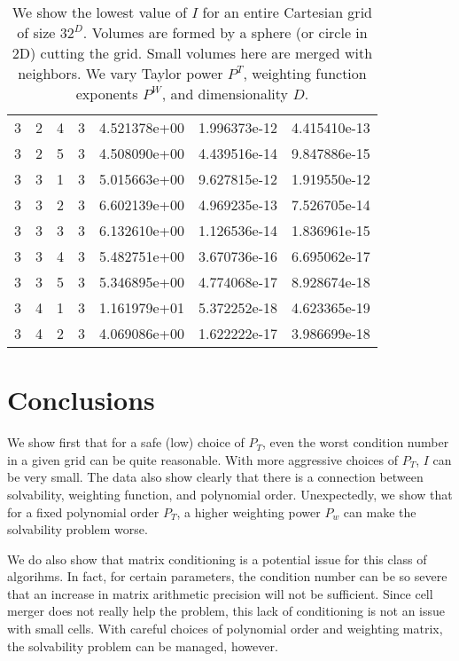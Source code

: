 \documentclass{article}
\begin{document}
\begin{table}
\begin{center}
\begin{tabular}{|cccc|ccc|}
3 & 2 & 4 & 3 & 4.521378e+00 & 1.996373e-12 & 4.415410e-13 \\ 
3 & 2 & 5 & 3 & 4.508090e+00 & 4.439516e-14 & 9.847886e-15 \\ 
3 & 3 & 1 & 3 & 5.015663e+00 & 9.627815e-12 & 1.919550e-12 \\ 
3 & 3 & 2 & 3 & 6.602139e+00 & 4.969235e-13 & 7.526705e-14 \\ 
3 & 3 & 3 & 3 & 6.132610e+00 & 1.126536e-14 & 1.836961e-15 \\ 
3 & 3 & 4 & 3 & 5.482751e+00 & 3.670736e-16 & 6.695062e-17 \\ 
3 & 3 & 5 & 3 & 5.346895e+00 & 4.774068e-17 & 8.928674e-18 \\ 
3 & 4 & 1 & 3 & 1.161979e+01 & 5.372252e-18 & 4.623365e-19 \\ 
3 & 4 & 2 & 3 & 4.069086e+00 & 1.622222e-17 & 3.986699e-18 \\
\hline
\end{tabular}
\end{center}
\label{tab::worst_merged_inv_conv}
\caption
    {
      We show the lowest value of
      $I$ for an entire Cartesian grid of size $32^D$.
      Volumes are  formed by a sphere (or circle in 2D) cutting the
      grid.   Small volumes here are merged with neighbors.
      We vary Taylor power $P^T$, weighting
      function exponents $P^W$, and dimensionality $D$. 
    }
\end{table}


\section{Conclusions}

We show first that for a safe (low) choice of
$P_T$, even the worst condition number in a given grid can be quite
reasonable. With more aggressive choices of $P_T$, $I$ can be very
small.  The data also
show clearly that there is a connection between solvability, weighting
function, and polynomial order.  Unexpectedly, we show that for a
fixed polynomial order $P_T$, a higher weighting power $P_w$ can make the
solvability problem worse.

We do also show that matrix conditioning is a  potential issue for
this class of algorihms.   In fact, for certain parameters,
the condition number  can be so severe that an
increase in matrix arithmetic precision will not be sufficient.
Since cell merger does not really help the
problem, this lack of conditioning is not an issue with small cells.
With careful choices of polynomial order and weighting matrix, the
solvability problem can be managed, however.
\end{document}
